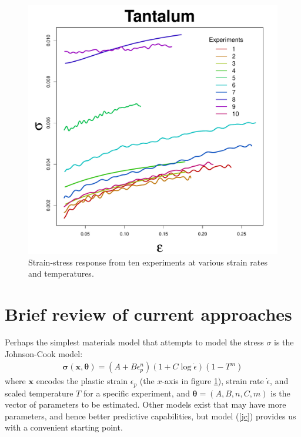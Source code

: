 \documentclass[12pt]{article}
\newcommand{\m}[1]{\mathbf{\bm{#1}}}
\begin{document}
\begin{figure}[H]
\begin{center}
\includegraphics[scale=0.40]{../figs/ta_all_data.pdf}
\caption{Strain-stress response from ten experiments at various strain rates and temperatures.}
\label{data}
\end{center}
\end{figure}

\section{Brief review of current approaches}

Perhaps the simplest materials model that attempts to model the stress $\sigma$ is the Johnson-Cook model:
\begin{align}
\m{\sigma}(\m{x}, \m{\theta}) = (A+B\epsilon_p^n)(1+C\log\dot\epsilon)(1-T^m)
\label{jc}
\end{align}
where $\m{x}$ encodes the plastic strain $\epsilon_p$ (the $x$-axis in figure \ref{data}), strain rate $\dot\epsilon$, and scaled temperature $T$ for a specific experiment, and $\m{\theta}=(A,B,n,C,m)$ is the vector of parameters to be estimated. Other models exist that may have more parameters, and hence better predictive capabilities, but model (\ref{jc}) provides us with a convenient starting point.
\end{document}
